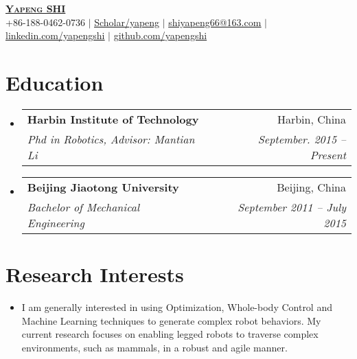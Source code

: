 \documentclass[letterpaper,11pt]{article}
\makeatletter
\newcommand{\resumeSubheading}[4]{
  \vspace{-2pt}\item
    \begin{tabular*}{0.97\textwidth}[t]{l@{\extracolsep{\fill}}r}
      \textbf{#1} & #2 \\
      \textit{#3} & \textit{\small #4} \\
    \end{tabular*}\vspace{-7pt}
}
\newcommand{\resumeSubHeadingListStart}{\begin{itemize}[leftmargin=0.15in, label={}]}
\newcommand{\resumeSubHeadingListEnd}{\end{itemize}}
\makeatother
\begin{document}

\begin{center}
    \textbf{\Huge \scshape \href{https://yapengshi.github.io/}{Yapeng SHI}} \\ \vspace{1pt}
    \small +86-188-0462-0736 $|$
    \href{https://scholar.google.com/citations?user=00aEs2gAAAAJ&hl=en}{\underline{Scholar/yapeng}} $|$ \href{mailto:shiyapeng66@163.com}{\underline{shiyapeng66@163.com}} $|$ 
    \href{https://www.linkedin.com/in/YapengShi}{\underline{linkedin.com/yapengshi}} $|$
    \href{https://github.com/yapengshi}{\underline{github.com/yapengshi}}
\end{center}


\section{Education}
  \resumeSubHeadingListStart
    \resumeSubheading
      {Harbin Institute of Technology}{Harbin, China}
      {Phd in Robotics, Advisor: Mantian Li}{September. 2015 -- Present}
    \resumeSubheading
      {Beijing Jiaotong University}{Beijing, China}
      {Bachelor of Mechanical Engineering}{September 2011 -- July 2015}
  \resumeSubHeadingListEnd
  
\vspace{-5mm}
\section{Research Interests}
 \begin{itemize}[leftmargin=0.2in, label={}]
\justifying \item I am generally interested in using Optimization, Whole-body Control and Machine Learning techniques to generate complex robot behaviors. My current research focuses on enabling legged robots to traverse complex environments, such as mammals, in a robust and agile manner.
\end{itemize}

\vspace{-7mm}
\end{document}
